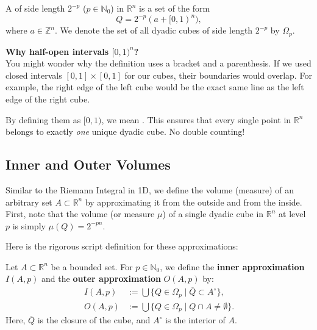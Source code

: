 \setcounter{savedSectionJM}{\value{section}}
\setcounter{savedDefJM}{\value{theorem}}

\setcounter{section}{13}
\setcounter{theorem}{0} 

\begin{definition}
A  of side length $2^{-p}$ ($p \in \mathbb{N}_0$) in $\mathbb{R}^n$ is a set of the form
\[
Q = 2^{-p}(a + [0, 1)^n),
\]
where $a \in \mathbb{Z}^n$. We denote the set of all dyadic cubes of side length $2^{-p}$ by $\Omega_p$.
\end{definition}

\begin{extra}
\textbf{Why half-open intervals $[0,1)^n$?} \\
You might wonder why the definition uses a bracket and a parenthesis. If we used closed intervals $[0,1] \times [0,1]$ for our cubes, their boundaries would overlap. For example, the right edge of the left cube would be the exact same line as the left edge of the right cube. 

By defining them as $[0,1)$, we mean . This ensures that every single point in $\mathbb{R}^n$ belongs to exactly \textit{one} unique dyadic cube. No double counting!
\end{extra}


\subsection{Inner and Outer Volumes}

Similar to the Riemann Integral in 1D, we define the volume (measure) of an arbitrary set $A \subset \mathbb{R}^n$ by approximating it from the outside and from the inside. First, note that the volume (or measure $\mu$) of a single dyadic cube in $\mathbb{R}^n$ at level $p$ is simply $\mu(Q) = 2^{-pn}$. %

Here is the rigorous script definition for these approximations:

\begin{definition}
Let $A \subset \mathbb{R}^n$ be a bounded set. For $p \in \mathbb{N}_0$, we define the \textbf{inner approximation} $I(A, p)$ and the \textbf{outer approximation} $O(A, p)$ by:
\begin{align*}
I(A, p) &:= \bigcup \{ Q \in \Omega_p \mid \overline{Q} \subset A^\circ \}, \\
O(A, p) &:= \bigcup \{ Q \in \Omega_p \mid Q \cap A \neq \emptyset \}.
\end{align*}
Here, $\overline{Q}$ is the closure of the cube, and $A^\circ$ is the interior of $A$. 
\end{definition}

